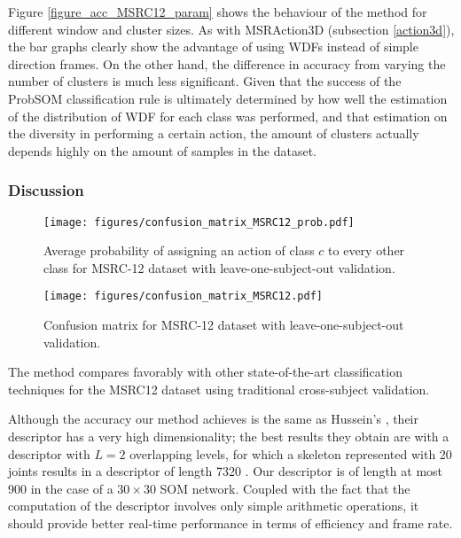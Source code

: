 \documentclass{fcs}
\begin{document}
Figure \ref{figure_acc_MSRC12_param} shows the behaviour of the method for different window and cluster sizes. As with MSRAction3D (subsection \ref{action3d}), the bar graphs clearly show the advantage of using WDFs instead of simple direction frames. On the other hand, the difference in accuracy from varying the number of clusters is much less significant. Given that the success of the ProbSOM classification rule is ultimately determined by how well the estimation of the distribution of WDF for each class was performed, and that estimation on the diversity in performing a certain action, the amount of clusters actually depends highly on the amount of samples in the dataset.





\subsubsection{Discussion}  

\begin{figure}
\texttt{[image: figures/confusion\_matrix\_MSRC12\_prob.pdf]}
\centering
\caption{Average probability of assigning an action of class $c$ to every other class for MSRC-12 dataset with leave-one-subject-out validation.}
\label{figure_confMatrix_MSRC12_prob}
\end{figure} 

\begin{figure}
\texttt{[image: figures/confusion\_matrix\_MSRC12.pdf]}
\centering
\caption{Confusion matrix for MSRC-12 dataset with leave-one-subject-out validation. }
\label{figure_confMatrix_MSRC12}
\end{figure} 




The method compares favorably with other state-of-the-art classification techniques for the MSRC12 dataset using traditional cross-subject validation. 

Although the accuracy our method achieves is the same as Hussein's \cite{hussein2013human}, their descriptor has a very high dimensionality; the best results they obtain are with a descriptor with $L=2$ overlapping levels, for which a skeleton represented with 20 joints results in a descriptor of length 7320 \cite{hussein2013human}.  Our descriptor is of length at most 900 in the case of a $30\times30$ SOM network. Coupled with the fact that the computation of the descriptor involves only simple arithmetic operations, it should provide better real-time performance in terms of efficiency and frame rate.
\end{document}
